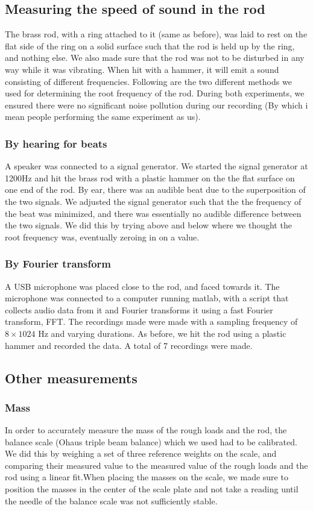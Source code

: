 \documentclass[11pt,a4paper]{article}
\begin{document}
  \subsection{Measuring the speed of sound in the rod}
      The brass rod, with a ring attached to it (same as before), was laid to rest on the flat side of the ring on a solid surface such that the rod is held up by the ring, and nothing else. We also made sure that the rod was not to be disturbed in any way while it was vibrating. When hit with a hammer, it will emit a sound consisting of different frequencies. Following are the two different methods we used for determining the root frequency of the rod.
      During both experiments, we ensured there were no significant noise pollution during our recording (By which i mean people performing the same experiment as us).
      \subsubsection{By hearing for beats}
        A speaker was connected to a signal generator. We started the signal generator at 1200Hz and hit the brass rod with a plastic hammer on the the flat surface on one end of the rod. By ear, there was an audible beat due to the superposition of the two signals. We adjusted the signal generator such that the the frequency of the beat was minimized, and there was essentially no audible difference between the two signals. We did this by trying above and below where we thought the root frequency was, eventually zeroing in on a value.

      \subsubsection{By Fourier transform}
        A USB microphone was placed close to the rod, and faced towards it. The microphone was connected to a computer running matlab, with a script that collects audio data from it and Fourier transforms it using a fast Fourier transform, FFT. The recordings made were made with a sampling frequency of $8\times1024$ Hz and varying durations. As before, we hit the rod using a plastic hammer and recorded the data. A total of 7 recordings were made.

      \subsection{Other measurements}
        \subsubsection{Mass}
          In order to accurately measure the mass of the rough loads and the rod, the balance scale (Ohaus triple beam balance) which we used had to be calibrated. We did this by weighing a set of three reference weights on the scale, and comparing their measured value to the measured value of the rough loads and the rod using a linear fit.When placing the masses on the scale, we made sure to position the masses in the center of the scale plate and not take a reading until the needle of the balance scale was not sufficiently stable.
\end{document}
